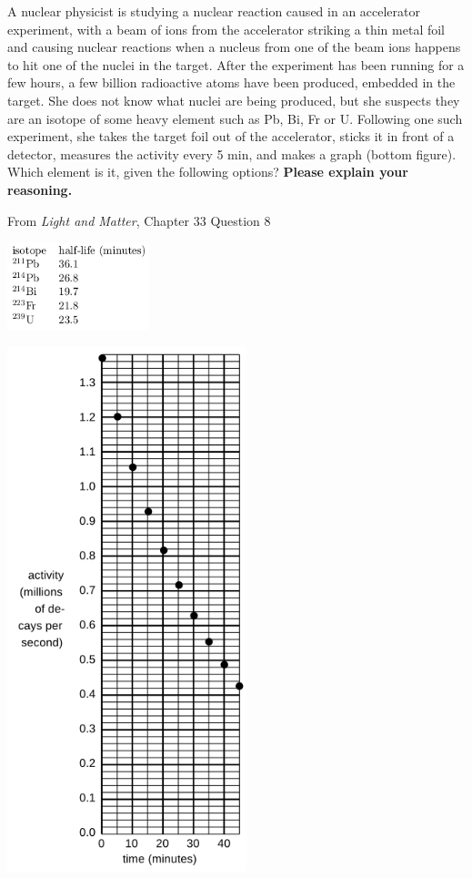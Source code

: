 \documentclass[addpoints,12pt]{exam}
\begin{document}
\begin{questions}
\clearpage

\question[4] A nuclear physicist is studying a nuclear reaction caused in
an accelerator experiment, with a beam of ions from the accelerator
striking a thin metal foil and causing nuclear reactions when a nucleus from one of the beam ions happens to hit one of the nuclei in
the target. After the experiment has been running for a few hours,
a few billion radioactive atoms have been produced, embedded in
the target. She does not know what nuclei are being produced, but
she suspects they are an isotope of some heavy element such as Pb,
Bi, Fr or U. Following one such experiment, she takes the target foil
out of the accelerator, sticks it in front of a detector, measures the
activity every 5 min, and makes a graph (bottom figure). Which element is it, given the following options? \textbf{Please explain your reasoning.}

From \textit{Light and Matter}, Chapter 33 Question 8


\includegraphics[height=1in]{../images/Isotopes.png}

\includegraphics[height=6in]{../images/decay.png}


\end{questions}
\end{document}
